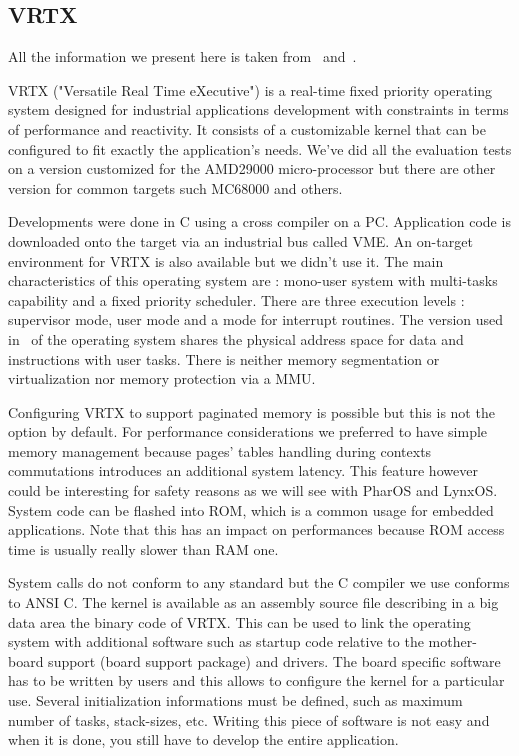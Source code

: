 \documentclass[10pt]{report}
\begin{document}
\subsection{VRTX}

All the information we present here is taken from~\cite{VRTX:90} and~\cite{AMD29000:91}.

VRTX ("Versatile Real Time eXecutive") is a real-time fixed
priority operating system designed for industrial applications
development with constraints in terms of performance and
reactivity. It consists of a customizable kernel that can be
configured to fit exactly the application's needs. We've did all
the evaluation tests on a version customized for the AMD29000
micro-processor but there are other version for common targets
such MC68000 and others.

Developments were done in C using a cross compiler on a PC.
Application code is downloaded onto the target via an industrial
bus called VME. An on-target environment for VRTX is also
available but we didn't use it. The main characteristics of this
operating system are : mono-user system with multi-tasks
capability and a fixed priority scheduler. There are three
execution levels : supervisor mode, user mode and a mode for
interrupt routines. The version used in~\cite{Delchini:95} of the
operating system shares the physical address space for data and
instructions with user tasks. There is neither memory
segmentation or virtualization nor memory protection via a MMU.

Configuring VRTX to support paginated memory is possible but this
is not the option by default. For performance considerations we
preferred to have simple memory management because pages' tables
handling during contexts commutations introduces an additional
system latency. This feature however could be interesting for
safety reasons as we will see with PharOS and LynxOS. System code
can be flashed into ROM, which is a common usage for embedded
applications. Note that this has an impact on performances
because ROM access time is usually really slower than RAM one.

System calls do not conform to any standard but the C compiler we
use conforms to ANSI C. The kernel is available as an assembly
source file describing in a big data area the binary code of VRTX.
This can be used to link the operating system with additional
software such as startup code relative to the mother-board support
(board support package) and drivers. The board specific software
has to be written by users and this allows to configure the kernel
for a particular use. Several initialization informations must be
defined, such as maximum number of tasks, stack-sizes, etc. Writing
this piece of software is not easy and when it is done, you still have to
develop the entire application.
\end{document}
